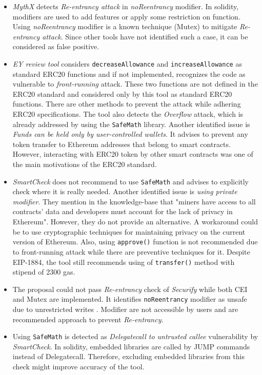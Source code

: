 \begin{itemize}[leftmargin=*]
	\item \textit{MythX} detects \textit{Re-entrancy attack} in \textit{noReentrancy} modifier. In solidity, modifiers are used to add features or apply some restriction on function\cite{SolidityModifer}. Using \textit{noReentrancy} modifier is a known technique (Mutex) to mitigate \textit{Re-entrancy attack}\cite{ReentrancyGuard}. Since other tools have not identified such a case, it can be considered as false positive.
	\item \textit{EY review tool} considers \texttt{decreaseAllowance} and \texttt{increaseAllowance} as standard ERC20 functions and if not implemented, recognizes the code as vulnerable to \textit{front-running} attack. These two functions are not defined in the ERC20 standard\cite{ERC20Std} and considered only by this tool as standard ERC20 functions. There are other methods to prevent the attack while adhering ERC20 specifications\cite{ERC20MWA}. The tool also detects the \textit{Overflow} attack, which is already addressed by using the \texttt{SafeMath} library. Another identified issue is \textit{Funds can be held only by user-controlled wallets}. It advises to prevent any token transfer to Ethereum addresses that belong to smart contracts. However, interacting with ERC20 token by other smart contracts was one of the main motivations of the ERC20 standard.
	\item \textit{SmartCheck} does not recommend to use \texttt{SafeMath} and advises to explicitly check where it is really needed. Another identified issue is \textit{using private modifier}. They mention in the knowledge-base that "miners have access to all contracts’ data and developers must account for the lack of privacy in Ethereum". However, they do not provide an alternative. A workaround could be to use cryptographic techniques for maintaining privacy on the current version of Ethereum. Also, using \texttt{approve()} function is not recommended due to front-running attack while there are preventive techniques for it. Despite EIP-1884, the tool still recommends using of \texttt{transfer()} method with stipend of 2300 gas.
	\item The proposal could not pass \textit{Re-entrancy} check of \textit{Securify} while both CEI and Mutex are implemented. It identifies \texttt{noReentrancy} modifier as unsafe due to unrestricted writes \cite{SECURIFY}. Modifier are not accessible by users and are recommended approach to prevent \textit{Re-entrancy}.
	\item Using \texttt{SafeMath} is detected as \textit{Delegatecall to untrusted callee} vulnerability by \textit{SmartCheck}. In solidity, embedded libraries are called by JUMP commands instead of Delegatecall. Therefore, excluding embedded libraries from this check might improve accuracy of the tool.
\end{itemize}
